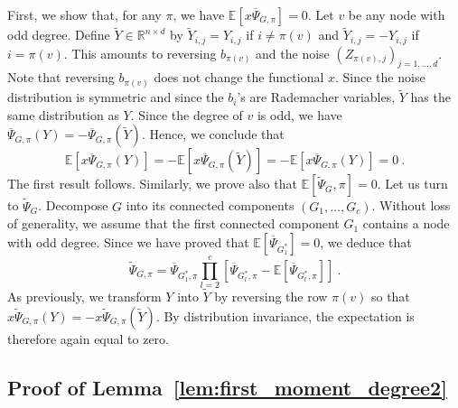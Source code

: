 \documentclass{article}
\begin{document}
        First, we show that, for any $\pi$, we have $\mathbb{E}[x\overline{\Psi}_{G,\pi}]=0$. Let $v$ be any node with odd degree. Define $\tilde{Y}\in \mathbb{R}^{n\times d}$ by $\tilde{Y}_{i,j}= Y_{i,j}$ if $i\neq \pi(v)$ and $\tilde{Y}_{i,j}= -Y_{i,j}$ if $i= \pi(v)$. This amounts to reversing $b_{\pi(v)}$ and the noise $(Z_{\pi(v),j})_{j=1,\ldots,d}$. Note that reversing $b_{\pi(v)}$ does not change the functional $x$. Since the noise distribution is symmetric and since the $b_i$'s are Rademacher variables, $\tilde{Y}$ has the same distribution as $Y$. Since the degree of $v$ is odd, we have $\overline{\Psi}_{G,\pi}(Y)= -\overline{\Psi}_{G,\pi}(\tilde{Y})$. Hence, we conclude that 
        \[
        \mathbb{E}[x\overline{\Psi}_{G,\pi}(Y)] = - \mathbb{E}[x\overline{\Psi}_{G,\pi}(\tilde{Y})] =- \mathbb{E}[x\overline{\Psi}_{G,\pi}(Y)] =0\ .
        \]
        The first result follows. Similarly, we prove also that  $\mathbb{E}[\widetilde{\Psi}_{G},\pi]=0$.
        Let us turn to $\widetilde{\Psi}_{G}$. Decompose $G$ into its connected components $(G_1,\ldots, G_c)$.
        Without loss of generality, we assume that the first connected component $G_1$  contains a node with odd degree. Since we have proved that $\mathbb{E}[\overline{\Psi}_{G^*_1}]= 0$, we deduce that 
        \[
        \widetilde{\Psi}_{G,\pi}= \overline{\Psi}_{G^*_1,\pi}\prod_{l=2}^c\left[\overline{\Psi}_{G^*_l,\pi} - \mathbb{E}[\overline{\Psi}_{G^*_l,\pi}] \right]\ . 
        \]
        As previously, we transform $Y$ into $\tilde{Y}$ by reversing the row $\pi(v)$ so that $x\widetilde{\Psi}_{G,\pi}(Y)= - x\widetilde{\Psi}_{G,\pi}(\tilde{Y})$. By distribution invariance, the expectation is therefore again equal to zero.


        
\subsection{Proof of Lemma~\ref{lem:first_moment_degree2}}
\end{document}
